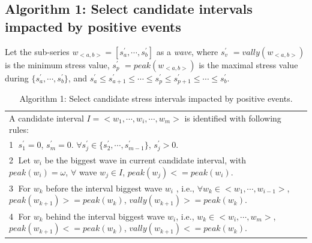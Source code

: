 \subsection{Algorithm 1: Select candidate intervals impacted by positive events}
\label{alg:alg1}
Let the sub-series $w_{<a,b>} = [s^{'}_a, \cdots, s^{'}_b]$ as a \emph{wave},
where $s^{'}_v$ $= {vally(w_{<a,b>})}$ is the minimum stress value,
$s^{'}_p$ $= peak(w_{<a,b>})$ is the maximal stress value during $\{s^{'}_a,\cdots,s^{'}_b\}$,
and $s^{'}_a \leq s^{'}_{a+1} \leq \cdots \leq s^{'}_p \leq s^{'}_{p+1} \leq \cdots \leq s^{'}_b$.

\begin{table}
\begin{center}
\caption{\small{Algorithm 1: Select candidate stress intervals impacted by positive events.}}
\begin{tabular}{l} \hline
A candidate interval $I = <w_1,\cdots, w_i,\cdots, w_m>$ is identified with following rules:\\
\textcircled{1} $s^{'}_1 = 0$, $s^{'}_m = 0$. $\forall s^{'}_j \in \{s^{'}_2,\cdots,s^{'}_{m-1}\}$, $s^{'}_j > 0$.\\
\textcircled{2} Let $w_i$ be the biggest wave in current candidate interval, with $peak(w_i) = \omega$, $\forall $ wave $w_j \in I$, $peak(w_j)<=peak(w_i)$.\\
\textcircled{3} For $w_k$ before the interval biggest wave $w_i$ , i.e., $\forall w_k \in <w_1,\cdots,w_{i-1}>$, $peak(w_{k+1})>=peak(w_k)$, $vally(w_{k+1}) >= peak(w_k)$.\\
\textcircled{4} For $w_k$ behind the interval biggest wave $w_i$, i.e.,  $w_k \in <w_{i}, \cdots, w_m>$, $peak(w_{k+1})<=peak(w_k)$, $vally(w_{k+1}) <= peak(w_k)$.\\\hline
\end{tabular}
\end{center}
\end{table}

